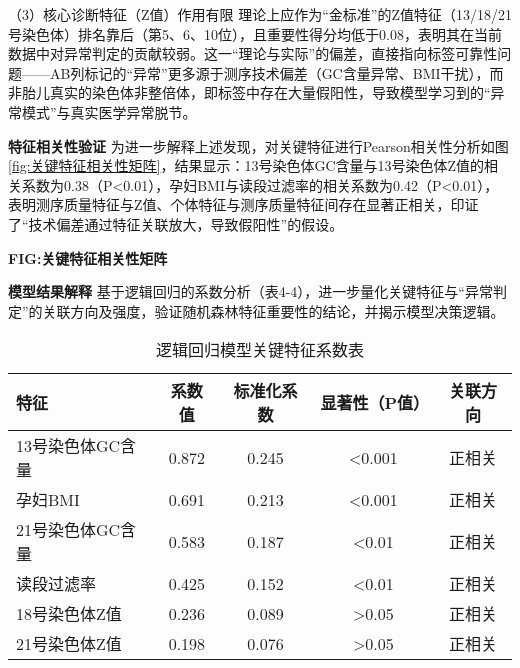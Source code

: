 \documentclass[withoutpreface,bwprint]{cumcmthesis} %
\begin{document}
（3）核心诊断特征（Z值）作用有限
理论上应作为“金标准”的Z值特征（13/18/21号染色体）排名靠后（第5、6、10位），且重要性得分均低于0.08，表明其在当前数据中对异常判定的贡献较弱。这一“理论与实际”的偏差，直接指向标签可靠性问题——AB列标记的“异常”更多源于测序技术偏差（GC含量异常、BMI干扰），而非胎儿真实的染色体非整倍体，即标签中存在大量假阳性，导致模型学习到的“异常模式”与真实医学异常脱节。


\textbf{特征相关性验证}
为进一步解释上述发现，对关键特征进行Pearson相关性分析如图\ref{fig:关键特征相关性矩阵}，结果显示：13号染色体GC含量与13号染色体Z值的相关系数为0.38（P<0.01），孕妇BMI与读段过滤率的相关系数为0.42（P<0.01），表明测序质量特征与Z值、个体特征与测序质量特征间存在显著正相关，印证了“技术偏差通过特征关联放大，导致假阳性”的假设。

\textbf{FIG:关键特征相关性矩阵}

\textbf{模型结果解释}
基于逻辑回归的系数分析（表4-4），进一步量化关键特征与“异常判定”的关联方向及强度，验证随机森林特征重要性的结论，并揭示模型决策逻辑。


\begin{table}[H]
    \centering  %
    \caption{逻辑回归模型关键特征系数表}  %
    \label{tab:逻辑回归模型关键特征系数表}  %
    \begin{threeparttable}
        \begin{tabularx}{0.88\textwidth}{l c c c c}
            \toprule[1.5pt]
            \textbf{特征} & \textbf{系数值} & \textbf{标准化系数} & \textbf{显著性（P值）} & \textbf{关联方向} \\ 
            \midrule[1pt]
            13号染色体GC含量    & 0.872    & 0.245      & <0.001        & 正相关   \\
            孕妇BMI             & 0.691    & 0.213      & <0.001        & 正相关   \\
            21号染色体GC含量    & 0.583    & 0.187      & <0.01         & 正相关   \\
            读段过滤率          & 0.425    & 0.152      & <0.01         & 正相关   \\
            18号染色体Z值       & 0.236    & 0.089      & >0.05         & 正相关   \\
            21号染色体Z值       & 0.198    & 0.076      & >0.05         & 正相关   \\

            \bottomrule[1.5pt]
        \end{tabularx}
    \end{threeparttable}
\end{table}
\end{document}
